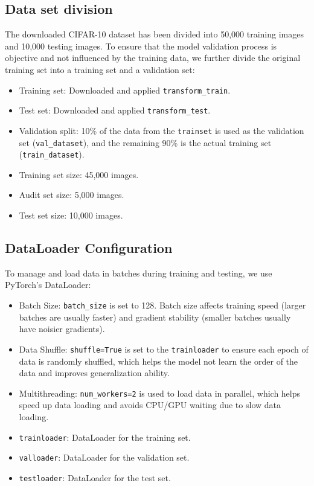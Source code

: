 \documentclass[12pt]{article}
\begin{document}
\subsection{Data set division}
The downloaded CIFAR-10 dataset has been divided into 50,000 training images and 10,000 testing images. To ensure that the model validation process is objective and not influenced by the training data, we further divide the original training set into a training set and a validation set:
\begin{itemize}
    \item Training set: Downloaded and applied \texttt{transform\_train}.
    \item Test set: Downloaded and applied \texttt{transform\_test}.
    \item Validation split: 10\% of the data from the \texttt{trainset} is used as the validation set (\texttt{val\_dataset}), and the remaining 90\% is the actual training set (\texttt{train\_dataset}).
    \item Training set size: 45,000 images.
    \item Audit set size: 5,000 images.
    \item Test set size: 10,000 images.
\end{itemize}

\subsection{DataLoader Configuration}
To manage and load data in batches during training and testing, we use PyTorch's DataLoader:
\begin{itemize}
    \item Batch Size: \texttt{batch\_size} is set to 128. Batch size affects training speed (larger batches are usually faster) and gradient stability (smaller batches usually have noisier gradients).
    \item Data Shuffle: \texttt{shuffle=True} is set to the \texttt{trainloader} to ensure each epoch of data is randomly shuffled, which helps the model not learn the order of the data and improves generalization ability.
    \item Multithreading: \texttt{num\_workers=2} is used to load data in parallel, which helps speed up data loading and avoids CPU/GPU waiting due to slow data loading.
    \item \texttt{trainloader}: DataLoader for the training set.
    \item \texttt{valloader}: DataLoader for the validation set.
    \item \texttt{testloader}: DataLoader for the test set.
\end{itemize}
\end{document}
